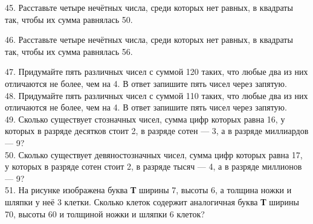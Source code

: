 \documentclass[12pt]{article}
\begin{document}
45. Расставьте четыре нечётных числа, среди которых нет равных, в квадраты так, чтобы их сумма равнялась 50.
\begin{center}
\begin{figure}[ht!]
\end{figure}
\end{center}
46. Расставьте четыре нечётных числа, среди которых нет равных, в квадраты так, чтобы их сумма равнялась 56.
\begin{center}
\begin{figure}[ht!]
\end{figure}
\end{center}
47. Придумайте пять различных чисел с суммой 120 таких, что любые два из них отличаются не более, чем на 4. В ответ запишите пять чисел через запятую.\\
48. Придумайте пять различных чисел с суммой 110 таких, что любые два из них отличаются не более, чем на 4. В ответ запишите пять чисел через запятую.\\
49. Сколько существует стозначных чисел, сумма цифр которых равна 16, у которых в разряде десятков стоит 2, в разряде сотен --- 3, а в разряде миллиардов --- 9?\\
50. Сколько существует девяностозначных чисел, сумма цифр которых равна 17, у которых в разряде сотен стоит 2, в разряде тысяч --- 4, а в разряде миллионов --- 9?\\
51. На рисунке изображена буква {\bf Т} ширины 7, высоты 6, а толщина ножки и шляпки у неё 3 клетки. Сколько клеток содержит аналогичная буква {\bf Т} ширины 70, высоты 60 и толщиной ножки и шляпки 6 клеток?
\begin{center}
\begin{figure}[ht!]
\end{figure}
\end{center}
\end{document}
